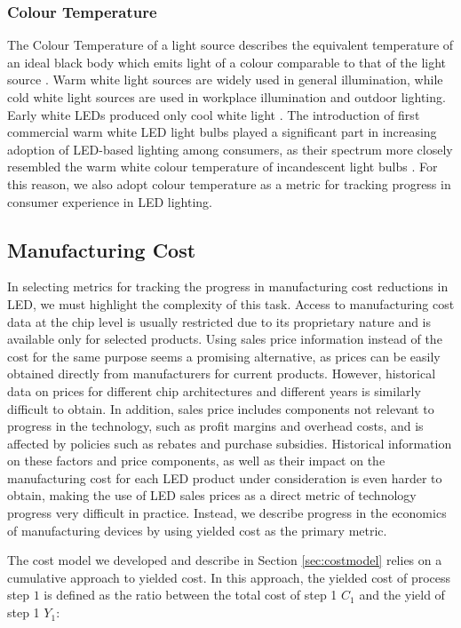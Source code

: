 \documentclass[twoside,twocolumn,9pt]{article}
\begin{document}
\subsubsection{Colour Temperature}

The Colour Temperature of a light source describes the equivalent temperature of an ideal black body which emits light of a colour comparable to that of the light source \cite{commission2011cie}. Warm white light sources are widely used in general illumination, while cold white light sources are used in workplace illumination and outdoor lighting. Early white LEDs produced only cool white light \cite{mueller2000light}. The introduction of first commercial warm white LED light bulbs played a significant part in increasing adoption of LED-based lighting among consumers, as their spectrum more closely resembled the warm white colour temperature of incandescent light bulbs \cite{al2016optics}. For this reason, we also adopt colour temperature as a metric for tracking progress in consumer experience in LED lighting.

\subsection{Manufacturing Cost}

In selecting metrics for tracking the progress in manufacturing cost reductions in LED, we must  highlight the complexity of this task. Access to manufacturing cost data at the chip level is usually restricted due to its proprietary nature and is available only for selected products. Using sales price information instead of the cost for the same purpose seems a promising alternative, as prices can be easily obtained directly from manufacturers for current products. However, historical data on prices for different chip architectures and different years is similarly difficult to obtain. In addition, sales price includes components not relevant to progress in the technology, such as profit margins and overhead costs, and is affected by policies such as rebates and purchase subsidies. Historical information on these factors and price components, as well as their impact on the manufacturing cost for each LED product under consideration is even harder to obtain, making the use of LED sales prices as a direct metric of technology progress very difficult in practice. Instead, we describe progress in the economics of manufacturing devices by using yielded cost as the primary metric.

The cost model we developed and describe in Section \ref{sec:costmodel} relies on a cumulative approach to yielded cost\cite{becker2001use}. In this approach, the yielded cost of process step $1$ is defined as the ratio between the total cost of step 1 $C_1$ and the yield of step 1 $Y_1$:
\end{document}
